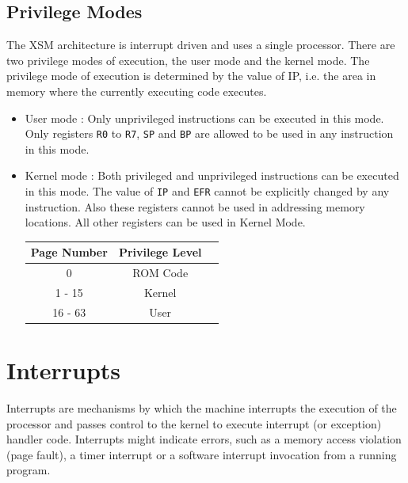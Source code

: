 \documentclass[11pt]{report}
\begin{document}
\section{Privilege Modes}
\label{sec:priv_modes}
The XSM architecture is interrupt driven and uses a single processor. There are two privilege modes of execution, the user mode and the kernel mode. The privilege mode of execution is determined by the value of IP, i.e. the area in memory where the currently executing code executes.


\begin{itemize}
\item User mode : Only unprivileged instructions can be executed in this mode. Only registers \texttt{R0} to \texttt{R7}, \texttt{SP} and \texttt{BP} are allowed to be used in any instruction in this mode.

\item Kernel mode : Both privileged and unprivileged instructions can be executed in this mode. The value of \texttt{IP} and \texttt{EFR} cannot be explicitly changed by any instruction. Also these registers cannot be used in addressing memory locations. All other registers can be used in Kernel Mode. 


 
\begin{center}
\begin{tabular}{|c|c|c|}
\hline \textbf{Page Number} & \textbf{Privilege Level} \\ 
\hline 0 & ROM Code \\ 
\hline 1 - 15 & Kernel \\ 
\hline 16 - 63 & User  \\ 

\hline
\end{tabular} 
\end{center}

\end{itemize}

\chapter{Interrupts}
\label{sec:int}

Interrupts are mechanisms by which the machine interrupts the execution of the processor and passes control to the kernel to execute interrupt (or exception) handler code. Interrupts might indicate errors, such as a memory access violation (page fault), a timer interrupt or a software interrupt invocation from a running program. \\
\end{document}

